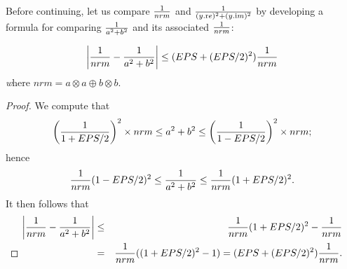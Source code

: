 Before continuing, let us compare ${1 \over nrm}$ and ${1 \over (y.{\mathrm re})^2 + (y.{\mathrm im})^2}$ by developing a formula for
comparing ${1 \over a^2 + b^2}$ and its associated ${1 \over nrm}$:
\begin{lemma}\label{GMT 7.2} $$\left|{1 \over nrm} - {1 \over a^2 + b^2}\right| \le   (EPS + (EPS/2)^2) {1 \over nrm}$$
{\textit where} $nrm = a\otimes a \oplus b \otimes b.$
\end{lemma}

\begin{proof}{}
We compute that 
$$\left({1 \over 1 + EPS/2}\right)^2 \times nrm
\le a^2 + b^2 
\le \left({1 \over 1 - EPS/2}\right)^2 \times nrm;$$ hence 
$${1 \over nrm} (1 - EPS/2)^2 
\le {1 \over a^2 + b^2}
\le {1 \over nrm} (1 + EPS/2)^2.$$  It then follows that 
\begin{eqnarray*}
\left|{1 \over nrm} - {1 \over a^2 + b^2}\right|& \le &
    {1 \over nrm} (1 + EPS/2)^2 - {1 \over nrm}\\
&=& {1 \over nrm} ((1 + EPS/2)^2 - 1) =
  (EPS + (EPS/2)^2){1 \over nrm} .\\
\noalign{\vskip-24pt}
\end{eqnarray*}
\end{proof}

